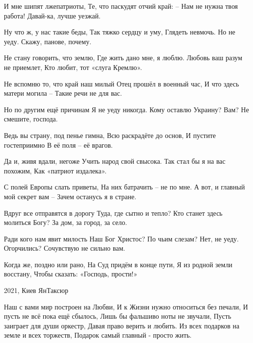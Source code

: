 И мне шипят лжепатриоты,
Те, что паскудят отчий край:
– Нам не нужна твоя работа!
Давай-ка, лучше уезжай.

Ну что ж, у нас такие беды,
Так тяжко сердцу и уму,
Глядеть невмочь. Но не уеду.
Скажу, панове, почему.

Не стану говорить, что землю,
Где жить дано мне, я люблю.
Любовь ваш разум не приемлет,
Кто любит, тот «слуга Кремлю».

Не вспомню то, что край наш милый
Отец прошёл в военный час,
И что здесь матери могила – 
Такие речи не для вас.

Но по другим ещё причинам
Я не уеду никогда.
Кому оставлю Украину?
Вам? Не смешите, господа.

Ведь вы страну, под пенье гимна,
Всю раскрадёте до основ,
И пустите гостеприимно
В её поля – её врагов.

Да и, живя вдали, негоже
Учить народ свой свысока.
Так стал бы я на вас похожим,
Как «патриот издалека».

С полей Европы слать приветы,
На них батрачить – не по мне.
А вот, и главный мой секрет вам – 
Зачем останусь я в стране.

Вдруг все отправятся в дорогу
Туда, где сытно и тепло?
Кто станет здесь молиться Богу?
За дом, за город, за село.

Ради кого нам явит милость
Наш Бог Христос? По чьим слезам?
Нет, не уеду. Огорчились?
Сочувствую не сильно вам.

Когда же, поздно или рано,
На Суд придём в конце пути,
Я из родной земли восстану,
Чтобы сказать: «Господь, прости!»

2021, Киев
ЯнТаксюр


Наш с вами мир построен на Любви, 
И к Жизни нужно относиться без печали, 
И пусть не всё пока ещё сбылось, 
Лишь бы фальшиво ноты не звучали, 
Пусть заиграет для души оркестр, 
Давая право верить и любить. 
Из всех подарков на земле и всех торжеств, 
Подарок самый главный - просто жить.


